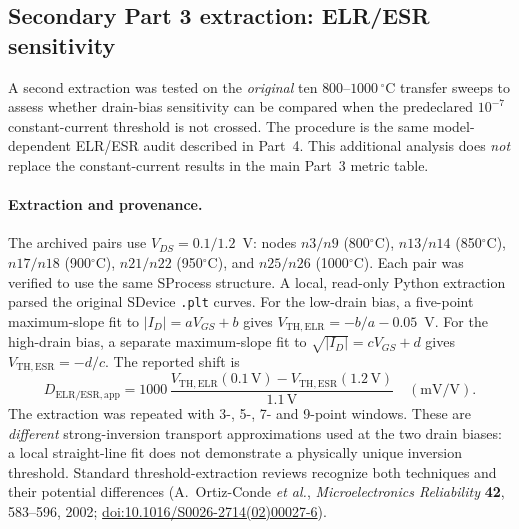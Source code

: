 \subsection[Secondary Part 3 DIBL extraction]{Secondary Part 3 extraction: ELR/ESR sensitivity}
A second extraction was tested on the \emph{original} ten
$800$--$1000\,^\circ$C transfer sweeps to assess whether
drain-bias sensitivity can be compared when the predeclared
$10^{-7}$ constant-current threshold is not crossed.
The procedure is the same model-dependent ELR/ESR audit
described in Part~4. This additional analysis does
\emph{not} replace the constant-current results in
the main Part~3 metric table.

\paragraph{Extraction and provenance.}
The archived pairs use $V_{DS}=0.1/1.2$~V:
nodes $n3/n9$ (800$^\circ$C), $n13/n14$ (850$^\circ$C),
$n17/n18$ (900$^\circ$C), $n21/n22$ (950$^\circ$C),
and $n25/n26$ (1000$^\circ$C).
Each pair was verified to use the same SProcess
structure. A local, read-only Python extraction
parsed the original SDevice \texttt{.plt} curves.
For the low-drain bias, a five-point maximum-slope fit
to $|I_D|=aV_{GS}+b$ gives
$V_{\mathrm{TH,ELR}}=-b/a-0.05$~V.
For the high-drain bias, a separate maximum-slope fit
to $\sqrt{|I_D|}=cV_{GS}+d$ gives
$V_{\mathrm{TH,ESR}}=-d/c$. The reported shift is
\[
D_{\mathrm{ELR/ESR,app}}
=1000\,\frac{V_{\mathrm{TH,ELR}}(0.1\mathrm{\,V})-
V_{\mathrm{TH,ESR}}(1.2\mathrm{\,V})}{1.1\mathrm{\,V}}
\quad(\mathrm{mV/V}).
\]
The extraction was repeated with 3-, 5-, 7- and
9-point windows. These are \emph{different} strong-inversion
transport approximations used at the two drain biases:
a local straight-line fit does not demonstrate a
physically unique inversion threshold. Standard
threshold-extraction reviews recognize both techniques
and their potential differences
(A.~Ortiz-Conde \emph{et al.},
\emph{Microelectronics Reliability} \textbf{42},
583--596, 2002;
\href{https://doi.org/10.1016/S0026-2714(02)00027-6}{doi:10.1016/S0026-2714(02)00027-6}).

